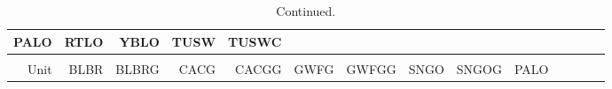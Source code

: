 \documentclass[]{article}
\begin{document}
{\begin{longtable}[]{@{}rrrrrrrrrrrrrr@{}}
\begin{minipage}[b]{0.04\columnwidth}
PALO\strut
\end{minipage} & \begin{minipage}[b]{0.04\columnwidth}\raggedleft\strut
RTLO\strut
\end{minipage} & \begin{minipage}[b]{0.04\columnwidth}\raggedleft\strut
YBLO\strut
\end{minipage} & \begin{minipage}[b]{0.04\columnwidth}\raggedleft\strut
TUSW\strut
\end{minipage} & \begin{minipage}[b]{0.04\columnwidth}\raggedleft\strut
TUSWC\strut
\end{minipage}\tabularnewline
\midrule
\endfirsthead
\caption{Continued.}\\%
\toprule
\begin{minipage}[b]{0.05\columnwidth}\raggedleft\strut
Unit\strut
\end{minipage} & \begin{minipage}[b]{0.05\columnwidth}\raggedleft\strut
BLBR\strut
\end{minipage} & \begin{minipage}[b]{0.05\columnwidth}\raggedleft\strut
BLBRG\strut
\end{minipage} & \begin{minipage}[b]{0.05\columnwidth}\raggedleft\strut
CACG\strut
\end{minipage} & \begin{minipage}[b]{0.05\columnwidth}\raggedleft\strut
CACGG\strut
\end{minipage} & \begin{minipage}[b]{0.05\columnwidth}\raggedleft\strut
GWFG\strut
\end{minipage} & \begin{minipage}[b]{0.05\columnwidth}\raggedleft\strut
GWFGG\strut
\end{minipage} & \begin{minipage}[b]{0.04\columnwidth}\raggedleft\strut
SNGO\strut
\end{minipage} & \begin{minipage}[b]{0.05\columnwidth}\raggedleft\strut
SNGOG\strut
\end{minipage} & \begin{minipage}[b]{0.04\columnwidth}\raggedleft\strut
PALO\strut
\end{minipage} & \begin{minipage}[b]{0.04\columnwidth}\raggedleft\strut

\end{minipage}
\end{longtable}}
\end{document}
